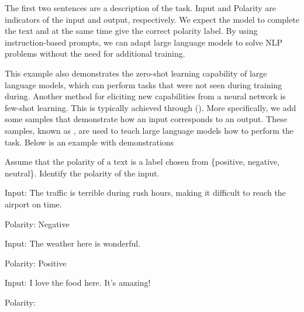 \noindent The first two sentences are a description of the task. {\color{blue} Input} and {\color{red} Polarity} are indicators of the input and output, respectively. We expect the model to complete the text and at the same time give the correct polarity label. By using instruction-based prompts, we can adapt large language models to solve NLP problems without the need for additional training.

This example also demonstrates the zero-shot learning capability of large language models, which can perform tasks that were not seen during training during. Another method for eliciting new capabilities from a neural network is few-shot learning. This is typically achieved through  (). More specifically, we add some samples that demonstrate how an input corresponds to an output. These samples, known as , are used to teach large language models how to perform the task. Below is an example with demonstrations

\vspace{0.5em}
\begin{tcolorbox}

\begingroup
\setlength{\leftskip}{2em}
\setlength{\rightskip}{2em}

Assume that the polarity of a text is a label chosen from \{positive, negative, neutral\}. Identify the polarity of the input.

\vspace{0.2cm}

{\color{blue} Input}: The traffic is terrible during rush hours, making it difficult to reach the airport on time.

\vspace{0.2cm}

{\color{red} Polarity}: Negative

\vspace{0.2cm}

{\color{blue} Input}: The weather here is wonderful.

\vspace{0.2cm}

{\color{red} Polarity}: Positive

\vspace{0.2cm}

{\color{blue} Input}: I love the food here. It's amazing!

\vspace{0.2cm}

{\color{red} Polarity}: \underline{\hspace{3em}}

\endgroup

\end{tcolorbox}
\vspace{0.5em}

